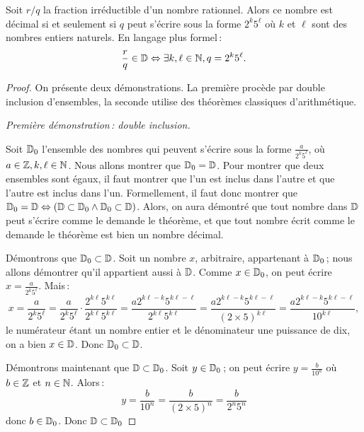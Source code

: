 		\begin{thm}
			Soit $r/q$ la fraction irréductible d'un nombre rationnel. Alors ce nombre est décimal si et seulement si $q$ peut s'écrire sous la forme $2^k5^\ell$ où $k$ et $\ell$ sont des nombres entiers naturels. En langage plus formel\,:
			\begin{equation}
				\frac{r}{q}\in\mathbb{D} \Leftrightarrow \exists k,\ell\in\mathbb{N}, q=2^k5^\ell.
			\end{equation}
		\end{thm}
		\begin{proof}
			On présente deux démonstrations. La première procède par double inclusion d'ensembles, la seconde utilise des théorèmes classiques d'arithmétique.
			
			\noindent\emph{Première démonstration\,: double inclusion.}

			Soit $\mathbb{D}_0$ l'ensemble des nombres qui peuvent s'écrire sous la forme $\frac{a}{2^k5^\ell}$, où $a\in\mathbb{Z}, k,\ell\in\mathbb{N}$. Nous allons montrer que $\mathbb{D}_0=\mathbb{D}$. Pour montrer que deux ensembles sont égaux, il faut montrer que l'un est inclus dans l'autre et que l'autre est inclus dans l'un. Formellement, il faut donc montrer que $\mathbb{D}_0=\mathbb{D}\Leftrightarrow (\mathbb{D}\subset\mathbb{D}_0\wedge\mathbb{D}_0\subset\mathbb{D})$. Alors, on aura démontré que tout nombre dans $\mathbb{D}$ peut s'écrire comme le demande le théorème, et que tout  nombre écrit comme le demande le théorème est bien un nombre décimal.

			Démontrons que $\mathbb{D}_0\subset\mathbb{D}$. Soit un nombre $x$, arbitraire, appartenant à $\mathbb{D}_0$\,; nous allons démontrer qu'il appartient aussi à $\mathbb{D}$. Comme $x\in\mathbb{D}_0$, on peut écrire $x=\frac{a}{2^k5^\ell}$. Mais\,:
			\begin{equation}
				x=\frac{a}{2^k5^\ell}=\frac{a}{2^k5^\ell}\cdot\frac{2^{k\ell}5^{k\ell}}{2^{k\ell}5^{k\ell}}=\frac{a 2^{k\ell-k}5^{k\ell-\ell}}{2^{k\ell}5^{k\ell}}=\frac{a2^{k\ell-k}5^{k\ell-\ell}}{(2\times 5)^{k\ell}}=\frac{a2^{k\ell-k}5^{k\ell-\ell}}{10^{k\ell}},
			\end{equation}
			le numérateur étant un nombre entier et le dénominateur une puissance de dix, on a bien $x\in\mathbb{D}$. Donc $\mathbb{D}_0\subset\mathbb{D}$.

			Démontrons maintenant que $\mathbb{D}\subset\mathbb{D}_0$. Soit $y\in\mathbb{D}_0$\,; on peut écrire $y=\frac{b}{10^n}$ où $b\in\mathbb{Z}$ et $n\in\mathbb{N}$. Alors\,:
			\begin{equation}
				y=\frac{b}{10^n}=\frac{b}{(2\times 5)^n}=\frac{b}{2^n5^n}
			\end{equation}
			donc $b\in\mathbb{D}_0$. Donc $\mathbb{D}\subset\mathbb{D}_0$


\end{proof}
